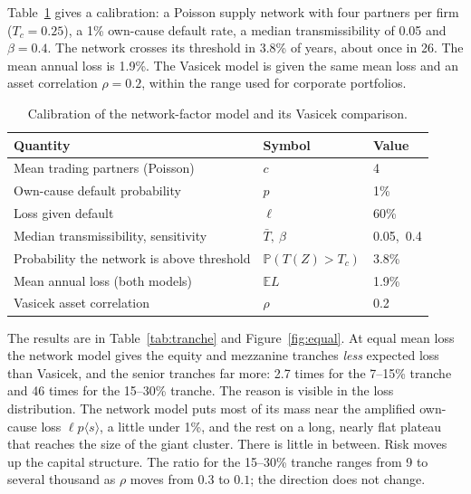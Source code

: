 \documentclass[11pt,a4paper]{article}
\theoremstyle{definition}
\theoremstyle{remark}
\newcommand{\E}{\mathbb{E}}
\newcommand{\PP}{\mathbb{P}}
\newcommand{\avg}[1]{\langle #1 \rangle}
\begin{document}
Table~\ref{tab:cal} gives a calibration: a Poisson supply network with four partners per firm ($T_c = 0.25$), a 1\% own-cause default rate, a median transmissibility of 0.05 and $\beta = 0.4$. The network crosses its threshold in 3.8\% of years, about once in 26. The mean annual loss is 1.9\%. The Vasicek model is given the same mean loss and an asset correlation $\rho = 0.2$, within the range used for corporate portfolios.

\begin{table}[h]
\centering
\begin{tabular}{lll}
\toprule
Quantity & Symbol & Value \\
\midrule
Mean trading partners (Poisson) & $c$ & 4 \\
Own-cause default probability & $p$ & 1\% \\
Loss given default & $\ell$ & 60\% \\
Median transmissibility, sensitivity & $\bar T,\ \beta$ & 0.05,\ 0.4 \\
Probability the network is above threshold & $\PP(T(Z) > T_c)$ & 3.8\% \\
Mean annual loss (both models) & $\E L$ & 1.9\% \\
Vasicek asset correlation & $\rho$ & 0.2 \\
\bottomrule
\end{tabular}
\caption{Calibration of the network-factor model and its Vasicek comparison.}
\label{tab:cal}
\end{table}

\begin{table}[h]
\centering

\caption{Expected tranche loss at equal mean portfolio loss. The last columns give the ratio for three Vasicek correlations.}
\label{tab:tranche}
\end{table}

The results are in Table~\ref{tab:tranche} and Figure~\ref{fig:equal}. At equal mean loss the network model gives the equity and mezzanine tranches \emph{less} expected loss than Vasicek, and the senior tranches far more: 2.7 times for the 7--15\% tranche and 46 times for the 15--30\% tranche. The reason is visible in the loss distribution. The network model puts most of its mass near the amplified own-cause loss $\ell p \avg{s}$, a little under 1\%, and the rest on a long, nearly flat plateau that reaches the size of the giant cluster. There is little in between. Risk moves up the capital structure. The ratio for the 15--30\% tranche ranges from 9 to several thousand as $\rho$ moves from $0.3$ to $0.1$; the direction does not change.
\end{document}
